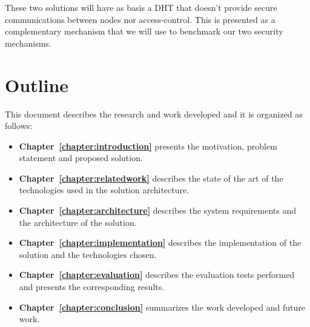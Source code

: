 These two solutions will have as basis a \ac{DHT} that doesn't provide secure communications between nodes nor access-control.
This is presented as a complementary mechanism that we will use to benchmark our two security mechanisms.

\section{Outline}
This document describes the research and work developed and it is organized as follows:

\begin{itemize}
  \item \textbf{Chapter~\ref{chapter:introduction}} presents the motivation, problem statement and proposed solution.
  \item \textbf{Chapter~\ref{chapter:relatedwork}} describes the state of the art of the technologies used in the solution architecture.
  \item \textbf{Chapter~\ref{chapter:architecture}} describes the system requirements and the architecture of the solution.
  \item \textbf{Chapter~\ref{chapter:implementation}} describes the implementation of the solution and the technologies chosen.
  \item \textbf{Chapter~\ref{chapter:evaluation}} describes the evaluation tests performed and presents the corresponding results.
  \item \textbf{Chapter~\ref{chapter:conclusion}} summarizes the work developed and future work.
\end{itemize}

\cleardoublepage
